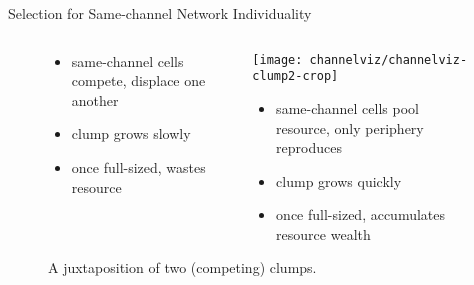 \begin{frame}{Selection for Same-channel Network Individuality}


\begin{figure}
\begin{columns}
\begin{column}{0.5\textwidth}
  \centering
  \footnotesize
  \begin{itemize}[<+->]
    \item same-channel cells compete, displace one another
    \item clump grows slowly
    \item once full-sized, wastes resource
  \end{itemize}
\end{column}
\begin{column}{0.5\textwidth}
  \centering
  \texttt{[image: channelviz/channelviz-clump2-crop]}
  \footnotesize
  \begin{itemize}[<+->]
    \item same-channel cells pool resource, only periphery reproduces
    \item clump grows quickly
    \item once full-sized, accumulates resource wealth
  \end{itemize}
\end{column}
\end{columns}
\caption{A juxtaposition of two (competing) clumps.}
\end{figure}

\end{frame}
